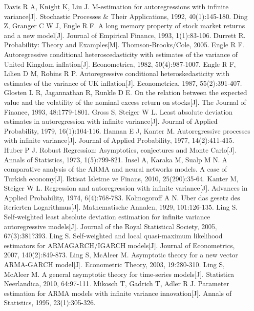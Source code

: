 \documentclass[a4paper,12pt,openany,oneside,utf-8]{ctexbook}
\begin{document}
\begin{spacing}{1.2}
\begin{thebibliography}{99}
{				 Davis R A, Knight K, Liu J. M-estimation for autoregressions with infinite variance[J]. Stochastic Processes \& Their Applications, 1992, 40(1):145-180.
				 Ding Z, Granger C W J, Engle R F. A long memory property of stock market returns and a new model[J]. Journal of Empirical Finance, 1993, 1(1):83-106.
				 Durrett R. Probability: Theory and Examples[M]. Thomson-Brooks/Cole, 2005.
				 Engle R F. Autoregressive conditional heteroscedasticity with estimates of the variance of United Kingdom inflation[J]. Econometrica, 1982, 50(4):987-1007.
				 Engle R F, Lilien D M, Robins R P. Autoregressive conditional heteroskedasticity with estimates of the variance of UK inflation[J]. Econometrica, 1987, 55(2):391-407.
				 Glosten L R, Jagannathan R, Runkle D E. On the relation between the expected value and the volatility of the nominal excess return on stocks[J]. The Journal of Finance, 1993, 48:1779-1801.
				 Gross S, Steiger W L. Least absolute deviation estimates in autoregression with infinite variance[J]. Journal of Applied Probability, 1979, 16(1):104-116.
				 Hannan E J, Kanter M. Autoregressive processes with infinite variance[J]. Journal of Applied Probability, 1977, 14(2):411-415.
				  Huber P J. Robust Regression: Asymptotics, conjectures and Monte Carlo[J]. Annals of Statistics, 1973, 1(5):799-821.
				 Insel A, Karaka M, Sualp M N. A comparative analysis of the ARMA and neural networks models. A case of Turkish economy[J]. Iktisat Isletme ve Finans, 2010, 25(290):35-64.
				 Kanter M, Steiger W L. Regression and autoregression with infinite variance[J]. Advances in Applied Probability, 1974, 6(4):768-783.
				 Kolmogoroff A N. $\ddot{\mathrm{U}}$ber das gesetz des iterierten Logarithmus[J]. Mathematische Annalen, 1929, 101:126-135.
				 Ling S. Self-weighted least absolute deviation estimation for infinite variance autoregressive models[J]. Journal of the Royal Statistical Society, 2005, 67(3):381?393.
				 Ling S. Self-weighted and local quasi-maximum likelihood estimators for ARMAGARCH/IGARCH models[J]. Journal of Econometrics, 2007, 140(2):849-873.
				 Ling S, McAleer M. Asymptotic theory for a new vector ARMA-GARCH model[J]. Econometric Theory, 2003, 19:280-310.
				 Ling S, McAleer M. A general asymptotic theory for time-series models[J]. Statistica Neerlandica, 2010, 64:97-111.
				 Mikosch T, Gadrich T, Adler R J. Parameter estimation for ARMA models with infinite variance innovation[J]. Annals of Statistics, 1995, 23(1):305-326.
}
\end{thebibliography}
\end{spacing}
\end{document}
